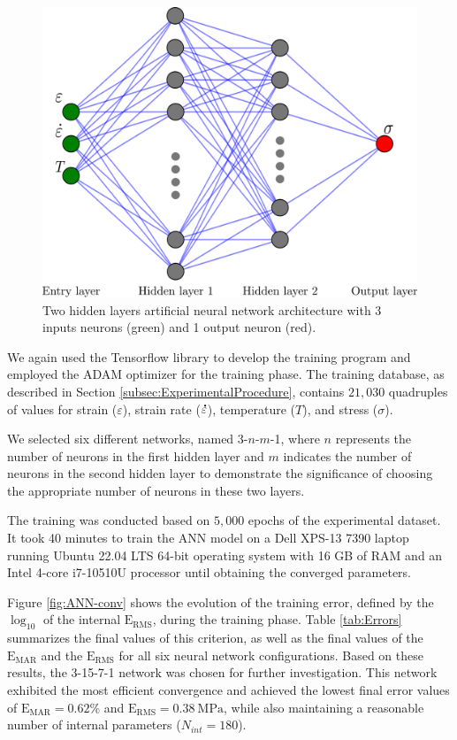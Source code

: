 \documentclass[metals,article,submit,pdftex,moreauthors]{Definitions/mdpi}
\DeclareRobustCommand{\mdot}[1]{\accentset{\mbox{\bfseries .}}{#1}}
\DeclareRobustCommand{\RMSE}{\text{E}_\text{RMS}}
\DeclareRobustCommand{\MARE}{\text{E}_\text{MAR}}
\DeclareRobustCommand{\MPa}{\text{MPa}}
\begin{document}
\begin{figure}[H]
\centering
\includegraphics[width=0.55\columnwidth]{Figures/ANN-scheme-2HL}
\caption{Two hidden layers artificial neural network architecture with 3 inputs neurons (green) and 1 output neuron (red).}
\label{fig:ANN-2HL}
\end{figure}

We again used the Tensorflow library to develop the training program and employed the ADAM optimizer for the training phase.
The training database, as described in Section \ref{subsec:ExperimentalProcedure}, contains $21,030$ quadruples of values for strain ($\varepsilon$), strain rate ($\mdot\varepsilon$), temperature ($T$), and stress ($\sigma$).

We selected six different networks, named 3-$n$-$m$-1, where $n$ represents the number of neurons in the first hidden layer and $m$ indicates the number of neurons in the second hidden layer to demonstrate the significance of choosing the appropriate number of neurons in these two layers.

The training was conducted based on $5,000$ epochs of the experimental dataset.
It took 40 minutes to train the ANN model on a Dell XPS-13 7390 laptop running Ubuntu 22.04 LTS 64-bit operating system with 16 GB of RAM and an Intel 4-core i7-10510U processor until obtaining the converged parameters.

Figure \ref{fig:ANN-conv} shows the evolution of the training error, defined by the $\log_{10}$ of the internal $\RMSE$, during the training phase.
Table \ref{tab:Errors} summarizes the final values of this criterion, as well as the final values of the $\MARE$ and the $\RMSE$ for all six neural network configurations.
Based on these results, the 3-15-7-1 network was chosen for further investigation.
This network exhibited the most efficient convergence and achieved the lowest final error values of $\MARE=0.62\%$ and $\RMSE=0.38~\MPa$, while also maintaining a reasonable number of internal parameters ($N_{int}=180$).
\end{document}
